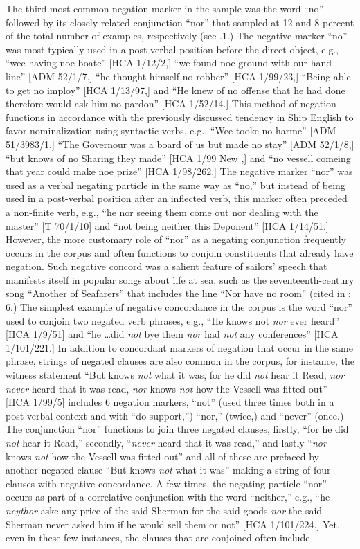 The third most common negation marker in the sample was the word “no” followed by its closely related conjunction “nor” that sampled at 12 and 8 percent of the total number of examples, respectively (see .1.) The negative marker “no” was most typically used in a post-verbal position before the direct object, e.g., “wee having noe boate” [HCA 1/12/2,] “we found noe ground with our hand line” [ADM 52/1/7,] “he thought himself no robber” [HCA 1/99/23,] “Being able to get no imploy” [HCA 1/13/97,] and “He knew of no offense that he had done therefore would ask him no pardon” [HCA 1/52/14.] This method of negation functions in accordance with the previously discussed tendency in Ship English to favor nominalization using syntactic verbs, e.g., “Wee tooke no harme” [ADM 51/3983/1,] “The Governour was a board of us but made no stay” [ADM 52/1/8,] “but knows of no Sharing they made” [HCA 1/99 New \citealt{Providence1722},] and “no vessell comeing that year could make noe prize” [HCA 1/98/262.] The negative marker “nor” was used as a verbal negating particle in the same way as “no,” but instead of being used in a post-verbal position after an inflected verb, this marker often preceded a non-finite verb, e.g., “he nor seeing them come out nor dealing with the master” [T 70/1/10] and “not being neither this Deponent” [HCA 1/14/51.] However, the more customary role of “nor” as a negating conjunction frequently occurs in the corpus and often functions to conjoin constituents that already have negation. Such negative concord was a salient feature of sailors’ speech that manifests itself in popular songs about life at sea, such as the seventeenth-century song “Another of Seafarers” that includes the line “Nor have no room” (cited in \citealt{Palmer1986}: 6.) The simplest example of negative concordance in the corpus is the word “nor” used to conjoin two negated verb phrases, e.g., “He knows not \textit{nor} ever heard” [HCA 1/9/51] and “he …did \textit{not} bye them \textit{nor} had \textit{not} any conferences” [HCA 1/101/221.] In addition to concordant markers of negation that occur in the same phrase, strings of negated clauses are also common in the corpus, for instance, the witness statement “But knows \textit{not} what it was, for he did \textit{not} hear it Read, \textit{nor never} heard that it was read, \textit{nor} knows \textit{not} how the Vessell was fitted out” [HCA 1/99/5] includes 6 negation markers, “not” (used three times both in a post verbal context and with “do support,”) “nor,” (twice,) and “never” (once.) The conjunction “nor” functions to join three negated clauses, firstly, “for he did \textit{not} hear it Read,” secondly, “\textit{never} heard that it was read,” and lastly “\textit{nor} knows \textit{not} how the Vessell was fitted out” and all of these are prefaced by another negated clause “But knows \textit{not} what it was” making a string of four clauses with negative concordance. A few times, the negating particle “nor” occurs as part of a correlative conjunction with the word “neither,” e.g., “he \textit{neythor} aske any price of the said Sherman for the said goods \textit{nor} the said Sherman never asked him if he would sell them or not” [HCA 1/101/224.] Yet, even in these few instances, the clauses that are conjoined often include 
